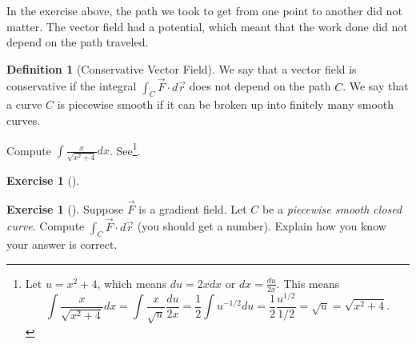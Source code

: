 \documentclass[10pt,]{book}
\theoremstyle{plain}
\theoremstyle{definition}
\newtheorem{definition}[theorem]{Definition}
\theoremstyle{definition}
\theoremstyle{definition}
\theoremstyle{definition}
\newtheorem{exploration}[project]{Exercise}
\theoremstyle{definition}
\numberwithin{equation}{section}
\newcommand{\ds}{\displaystyle}
\begin{document}
In the exercise above, the path we took to get from one point to another did not matter. The vector field had a potential, which meant that the work done did not depend on the path traveled.%
\begin{definition}[{Conservative Vector Field}]\label{definition-36}
We say that a vector field is conservative if the integral \(\int_C \vec F\cdot d\vec r\) does not depend on the path \(C\). We say that a curve \(C\) is piecewise smooth if it can be broken up into finitely many smooth curves.%
\end{definition}
Compute \(\ds \int \frac{x}{\sqrt{x^2+4}}dx\). See\footnote{Let \(u=x^2+4\), which means \(du=2xdx\) or \(dx=\frac{du}{2x}\).  This means%
\begin{equation*}
\ds \int \frac{x}{\sqrt{x^2+4}}dx 
= \int \frac{x}{\sqrt{u}}\frac{du}{2x} 
= \frac{1}{2}\int u^{-1/2}du
= \frac{1}{2}\frac{u^{1/2}}{1/2}
= \sqrt{u} = \sqrt{x^2+4}.
\end{equation*}
\label{fn-20}}.%
\begin{exploration}[]\label{exploration-210}
\end{exploration}
\begin{exploration}[]\label{exploration-211}
Suppose \(\vec F\) is a gradient field. Let \(C\) be a \emph{piecewise smooth closed curve}. Compute \(\int_C \vec F\cdot d\vec r\) (you should get a number). Explain how you know your answer is correct.%
\end{exploration}
\typeout{************************************************}
\typeout{************************************************}
\end{document}
